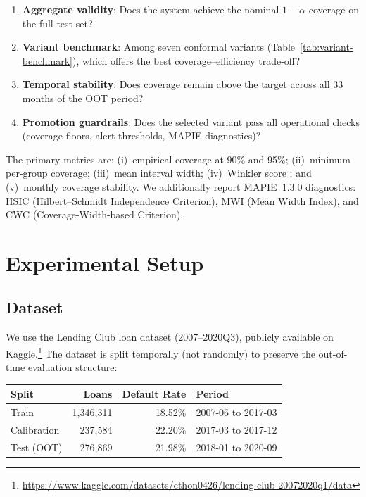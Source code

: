 \documentclass[pmlr]{jmlr}
\begin{document}
\begin{enumerate}
    \item \textbf{Aggregate validity}: Does the system achieve the nominal
    $1-\alpha$ coverage on the full test set?
    \item \textbf{Variant benchmark}: Among seven conformal variants (Table~\ref{tab:variant-benchmark}), which offers the best
    coverage--efficiency trade-off?
    \item \textbf{Temporal stability}: Does coverage remain above the target
    across all 33 months of the OOT period?
    \item \textbf{Promotion guardrails}: Does the selected variant pass all
    operational checks (coverage floors, alert thresholds, MAPIE diagnostics)?
\end{enumerate}

The primary metrics are: (i)~empirical coverage at 90\% and 95\%;
(ii)~minimum per-group coverage; (iii)~mean interval width;
(iv)~Winkler score \citep{winkler1972}; and (v)~monthly coverage stability.
We additionally report MAPIE~1.3.0 diagnostics: HSIC (Hilbert--Schmidt
Independence Criterion), MWI (Mean Width Index), and CWC (Coverage-Width-based
Criterion).

\section{Experimental Setup}
\label{sec:experiments}

\subsection{Dataset}

We use the Lending Club loan dataset (2007--2020Q3), publicly available on
Kaggle.\footnote{\url{https://www.kaggle.com/datasets/ethon0426/lending-club-20072020q1/data}}
The dataset is split temporally (not randomly) to preserve the out-of-time
evaluation structure:

\begin{center}
\begin{tabular}{lrrl}
\toprule
Split & Loans & Default Rate & Period \\
\midrule
Train & 1{,}346{,}311 & 18.52\% & 2007-06 to 2017-03 \\
Calibration & 237{,}584 & 22.20\% & 2017-03 to 2017-12 \\
Test (OOT) & 276{,}869 & 21.98\% & 2018-01 to 2020-09 \\
\bottomrule
\end{tabular}
\end{center}
\end{document}
